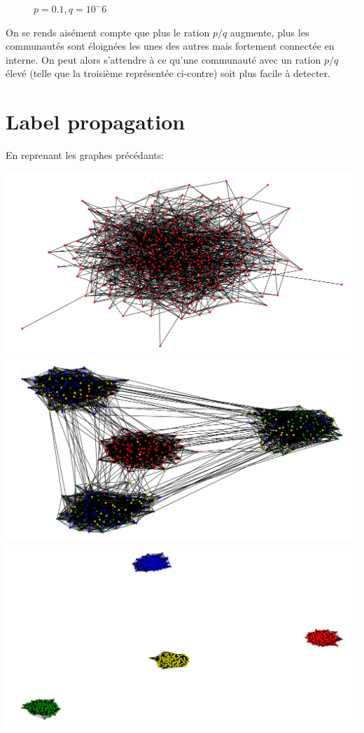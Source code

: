 \documentclass[a4paper]{report}
\begin{document}
\begin{center}
\begin{figure}[!h]
    \caption*{$p=0.1, q=10^-6$}
  \end{figure}
\end{center}

On se rends aisément compte que plus le ration $p/q$ augmente, plus les communautés sont éloignées les unes des autres mais fortement connectée en interne. On peut alors s'attendre à ce qu'une communauté avec un ration $p/q$ élevé (telle que la troisième représentée ci-contre) soit plus facile à detecter.

\section{Label propagation}
En reprenant les graphes précédants:

\begin{center}
  \includegraphics[width=0.3\paperwidth]{assets/0101coms.png}\\
  \includegraphics[width=0.3\paperwidth]{assets/01001coms.png}\\
  \includegraphics[width=0.3\paperwidth]{assets/01000001coms.png}\\
\end{center}
\end{document}
